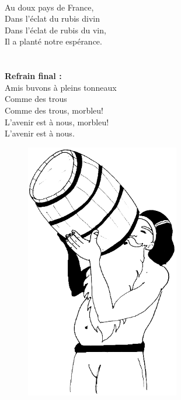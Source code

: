 \\Au doux pays de France,
\\Dans l'éclat du rubis divin %
\\Dans l'éclat de rubis du vin,
\\Il a planté notre espérance.
\\\\\\\textbf{Refrain final :}
\\Amis buvons à pleins tonneaux
\\Comme des trous
\\Comme des trous, morbleu!
\\L'avenir est à nous, morbleu!
\\L'avenir est à nous.
\\
\begin{figure}[h!]
\centering
   \includegraphics[width=0.6\textwidth]{images/ah_que_nos_peres.png}
 \end{figure}

\breakpage